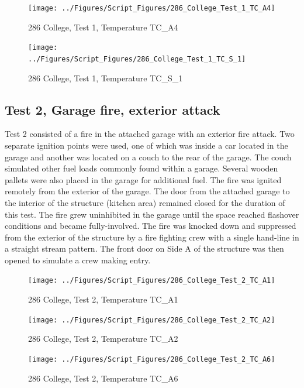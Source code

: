 \documentclass[12pt,oneside]{book}
\begin{document}
\begin{figure}[!ht]
\texttt{[image: ../Figures/Script\_Figures/286\_College\_Test\_1\_TC\_A4]}
\caption{286 College, Test 1, Temperature TC\_A4}
\label{fig:286_College_Test_1_TC_A4}
\end{figure}

\begin{figure}[!ht]
\texttt{[image: ../Figures/Script\_Figures/286\_College\_Test\_1\_TC\_S\_1]}
\caption{286 College, Test 1, Temperature TC\_S\_1}
\label{fig:286_College_Test_1_TC_S_1}
\end{figure}


\clearpage


\subsection{Test 2, Garage fire, exterior attack}

Test 2 consisted of a fire in the attached garage with an exterior fire attack. Two separate ignition points were used, one of which was inside a car located in the garage and another was located on a couch to the rear of the garage. The couch simulated other fuel loads commonly found within a garage. Several wooden pallets were also placed in the garage for additional fuel. The fire was ignited remotely from the exterior of the garage. The door from the attached garage to the interior of the structure (kitchen area) remained closed for the duration of this test. The fire grew uninhibited in the garage until the space reached flashover conditions and became fully-involved. The fire was knocked down and suppressed from the exterior of the structure by a fire fighting crew with a single hand-line in a straight stream pattern. The front door on Side A of the structure was then opened to simulate a crew making entry. 

\begin{figure}[!ht]
\texttt{[image: ../Figures/Script\_Figures/286\_College\_Test\_2\_TC\_A1]}
\caption{286 College, Test 2, Temperature TC\_A1}
\label{fig:286_College_Test_2_TC_A1}
\end{figure}

\begin{figure}[!ht]
\texttt{[image: ../Figures/Script\_Figures/286\_College\_Test\_2\_TC\_A2]}
\caption{286 College, Test 2, Temperature TC\_A2}
\label{fig:286_College_Test_2_TC_A2}
\end{figure}

\begin{figure}[!ht]
\texttt{[image: ../Figures/Script\_Figures/286\_College\_Test\_2\_TC\_A6]}
\caption{286 College, Test 2, Temperature TC\_A6}
\label{fig:286_College_Test_2_TC_A6}
\end{figure}
\end{document}
